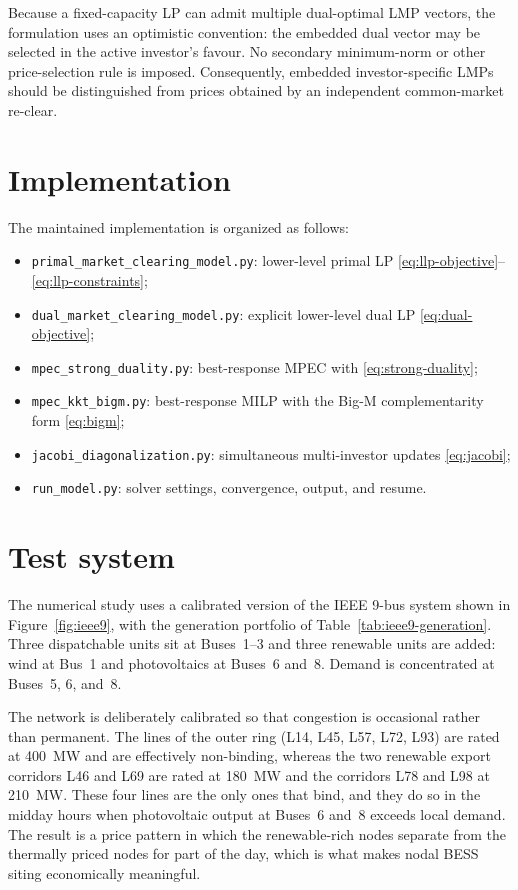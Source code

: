 \documentclass[11pt,a4paper,fleqn]{article}
\numberwithin{equation}{section}
\begin{document}
Because a fixed-capacity LP can admit multiple dual-optimal LMP vectors, the
formulation uses an optimistic convention: the embedded dual vector may be
selected in the active investor's favour. No secondary minimum-norm or other
price-selection rule is imposed. Consequently, embedded investor-specific LMPs
should be distinguished from prices obtained by an independent common-market
re-clear.

\section{Implementation}

The maintained implementation is organized as follows:
\begin{itemize}
\item \texttt{primal\_market\_clearing\_model.py}: lower-level primal LP
      \eqref{eq:llp-objective}--\eqref{eq:llp-constraints};
\item \texttt{dual\_market\_clearing\_model.py}: explicit lower-level dual LP
      \eqref{eq:dual-objective};
\item \texttt{mpec\_strong\_duality.py}: best-response MPEC with
      \eqref{eq:strong-duality};
\item \texttt{mpec\_kkt\_bigm.py}: best-response MILP with the Big-M
      complementarity form \eqref{eq:bigm};
\item \texttt{jacobi\_diagonalization.py}: simultaneous multi-investor updates
      \eqref{eq:jacobi};
\item \texttt{run\_model.py}: solver settings, convergence, output, and resume.
\end{itemize}

\section{Test system}
\label{sec:test-system}

The numerical study uses a calibrated version of the IEEE 9-bus system shown
in Figure~\ref{fig:ieee9}, with the generation portfolio of
Table~\ref{tab:ieee9-generation}. Three dispatchable units sit at Buses~1--3
and three renewable units are added: wind at Bus~1 and photovoltaics at
Buses~6 and~8. Demand is concentrated at Buses~5, 6, and~8.

The network is deliberately calibrated so that congestion is occasional rather
than permanent. The lines of the outer ring (L14, L45, L57, L72, L93) are
rated at 400~MW and are effectively non-binding, whereas the two renewable
export corridors L46 and L69 are rated at 180~MW and the corridors L78 and L98
at 210~MW. These four lines are the only ones that bind, and they do so in the
midday hours when photovoltaic output at Buses~6 and~8 exceeds local demand.
The result is a price pattern in which the renewable-rich nodes separate from
the thermally priced nodes for part of the day, which is what makes nodal BESS
siting economically meaningful.
\end{document}
